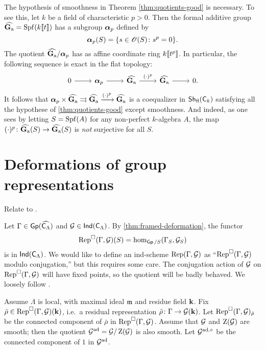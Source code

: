 \begin{example}
The hypothesis of smoothness in Theorem \ref{thm:quotients-good} is necessary. 
To see this, let $k$ be a field of characteristic $p>0$. Then the formal 
additive group $\widehat{\mathbf{G}_\mathrm{a}}=\operatorname{Spf}(k\llbracket t \rrbracket)$ has a subgroup ${\boldsymbol\alpha}_p$ defined 
by 
\[
  {\boldsymbol\alpha}_p(S) = \{s\in \mathscr{O}(S)\colon s^p=0\} .
\]
The quotient $\widehat{\mathbf{G}_\mathrm{a}}/{\boldsymbol\alpha}_p$ has as affine coordinate ring 
$k\llbracket t^p \rrbracket$. In particular, the following sequence is exact in the flat 
topology:
\[
\begin{tikzcd}
	0 \ar[r]
		& \balpha_p \ar[r]
		& \widehat\Ga \ar[r, "(\cdot)^p"]
		& \widehat\Ga \ar[r]
		& 0 .
\end{tikzcd}
\]
It follows that 
${\boldsymbol\alpha}_p\times \widehat{\mathbf{G}_\mathrm{a}}\rightrightarrows\widehat{\mathbf{G}_\mathrm{a}}\xrightarrow{(\cdot)^p} \widehat{\mathbf{G}_\mathrm{a}}$
is a coequalizer in $\operatorname{\mathsf{Sh}}_{\mathrm{fl}}(\mathsf{C}_k)$ satisfying all the hypothese 
of \ref{thm:quotients-good} except smoothness. And indeed, as one sees by 
letting $S=\operatorname{Spf}(A)$ for any non-perfect $k$-algebra $A$, the map 
$(\cdot)^p\colon \widehat{\mathbf{G}_\mathrm{a}}(S)\to \widehat{\mathbf{G}_\mathrm{a}}(S)$ is \emph{not} surjective for 
all $S$. 
\end{example}





\section{Deformations of group representations}

Relate to \cite{bockle-2013}. 

Let $\Gamma\in \operatorname{\mathsf{Gp}}(\widehat{\mathsf{C}_\Lambda})$ and $\mathcal{G}\in \operatorname{\mathsf{Ind}}(\mathsf{C}_\Lambda)$. By 
\ref{thm:framed-deformation}, the functor 
\[
  \operatorname{Rep}^\square(\Gamma,\mathcal{G})(S) = \hom_{\operatorname{\mathsf{Gp}}/S}(\Gamma_S,\mathcal{G}_S)
\]
is in $\operatorname{\mathsf{Ind}}(\mathsf{C}_\Lambda)$. We would like to define an ind-scheme 
$\operatorname{Rep}(\Gamma,\mathcal{G})$ as ``$\operatorname{Rep}^\square(\Gamma,\mathcal{G})$ modulo conjugation,'' but 
this requires some care. The conjugation action of $\mathcal{G}$ on 
$\operatorname{Rep}^\square(\Gamma,\mathcal{G})$ will have fixed points, so the quotient will be 
badly behaved. We loosely follow \cite{tilouine-1996}. 

Assume $\Lambda$ is local, with maximal ideal $\mathfrak{m}$ and residue field $\mathbf{k}$. 
Fix $\bar\rho\in \operatorname{Rep}^\square(\Gamma,\mathcal{G})(\mathbf{k})$, i.e.~a residual representation 
$\bar\rho\colon \Gamma\to \mathcal{G}(\mathbf{k})$. Let $\operatorname{Rep}^\square(\Gamma,\mathcal{G})_{\bar\rho}$ 
be the connected component of $\bar\rho$ in $\operatorname{Rep}^\square(\Gamma,\mathcal{G})$. Assume 
that $\mathcal{G}$ and $\operatorname{Z}(\mathcal{G})$ are smooth; then the quotient 
$\mathcal{G}^{\mathrm{ad}}=\mathcal{G}/\operatorname{Z}(\mathcal{G})$ is also smooth. Let $\mathcal{G}^{\mathrm{ad},\circ}$ be the 
connected component of $1$ in $\mathcal{G}^{\mathrm{ad}}$. 

